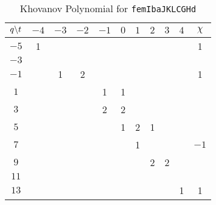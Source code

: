 \documentclass{article}
\theoremstyle{plain}
\begin{document}
        \begin{table}[H]
            \centering
            \begin{tabular}{| c | c | c | c | c | c | c | c | c | c | c |}
                \hline
                $q\symbol{92}t$&$-4$&$-3$&$-2$&$-1$&$0$&$1$&$2$&$3$&$4$&$\chi$\\
                \hline
                $-5$&1&&&&&&&&&1\\
                \hline
                $-3$&&&&&&&&&&\\
                \hline
                $-1$&&1&2&&&&&&&1\\
                \hline
                $1$&&&&1&1&&&&&\\
                \hline
                $3$&&&&2&2&&&&&\\
                \hline
                $5$&&&&&1&2&1&&&\\
                \hline
                $7$&&&&&&1&&&&$-1$\\
                \hline
                $9$&&&&&&&2&2&&\\
                \hline
                $11$&&&&&&&&&&\\
                \hline
                $13$&&&&&&&&&1&1\\
                \hline
            \end{tabular}
            \caption{Khovanov Polynomial for \texttt{femIbaJKLCGHd}}
            \label{table:femIbaJKLCGHd_kho}
        \end{table}
\end{document}
